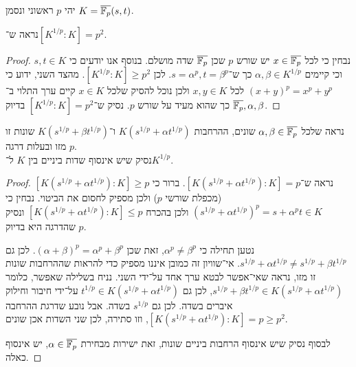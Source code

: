 \question{}
יהי $p$ ראשוני ונסמן $K = \overline{\mathbb{F}_p}(s, t)$.

\subquestion{}
נראה ש־$[K^{1 / p} : K] = p^2$.
\begin{proof}
	נבחין כי לכל $x \in \overline{\mathbb{F}_p}$ יש שורש $p$ שכן $\overline{\mathbb{F}_p}$ שדה מושלם.
	בנוסף אנו יודעים כי $s, t \in K$ וכי קיימים $\alpha, \beta \in K^{1 / p}$ כך ש־$s = \alpha^p, t = \beta^p$.
	לכן $[K^{1 / p} : K] \ge p^2$.
	מהצד השני, ידוע כי ${(x + y)}^p = x^p + y^p$ לכל $x, y \in K$ ולכן נוכל להסיק שלכל $x \in K$ קיים ערך התלוי ב־$\overline{\mathbb{F}_p}, \alpha, \beta$ כך שהוא מעיד על שורש $p$.
	נסיק ש־$[K^{1 / p} : K] = p^2$ בדיוק.
\end{proof}

\subquestion{}
נראה שלכל $\alpha, \beta \in \overline{\mathbb{F}_p}$ שונים,
ההרחבות $K(s^{1 / p} + \alpha t^{1 / p})$ ו־$K(s^{1 / p} + \beta t^{1 / p})$ שונות זו מזו ובעלות דרגה $p$. \\
נסיק שיש אינסוף שדות ביניים בין $K$ ל־$K^{1 / p}$.
\begin{proof}
	נראה ש־$[K(s^{1 / p} + \alpha t^{1 / p}) : K] = p$.
	ברור כי $[K(s^{1 / p} + \alpha t^{1 / p}) : K] \ge p$ (מכפלת שורשי $p$) ולכן מספיק לחסום את הביטוי.
	נבחין כי ${(s^{1 / p} + \alpha t^{1 / p})}^p = s + \alpha^p t \in K$ ולכן בהכרח $[K(s^{1 / p} + \alpha t^{1 / p}) : K] \le p$ ונסיק שהדרגה היא בדיוק $p$.

	נטען תחילה כי $\alpha^p \ne \beta^p$, זאת שכן ${(\alpha + \beta)}^p = \alpha^p + \beta^p$.
	לכן גם $s^{1 / p} + \alpha t^{1 / p} \ne s^{1 / p} + \beta t^{1 / p}$.
	אי־שוויון זה כמובן איננו מספיק כדי להראות שההרחבות שונות זו מזו, נראה שאי־אפשר לבטא ערך אחד על־ידי השני.
	נניח בשלילה שאפשר, כלומר $s^{1 / p} + \beta t^{1 / p} \in K(s^{1 / p} + \alpha t^{1 / p})$, לכן גם $t^{1 / p} \in K(s^{1 / p} + \alpha t^{1 / p})$ על־ידי חיבור וחילוק איברים בשדה.
	לכן גם $s^{1 / p}$ בשדה.
	אבל נובע שדרגת ההרחבה $[K(s^{1 / p} + \alpha t^{1 / p}) : K] = p \ge p^2$, וזו סתירה, לכן שני השדות אכן שונים.

	לבסוף נסיק שיש אינסוף הרחבות ביניים שונות, זאת ישירות מבחירת $\alpha \in \overline{\mathbb{F}_p}$, יש אינסוף כאלה.
\end{proof}


